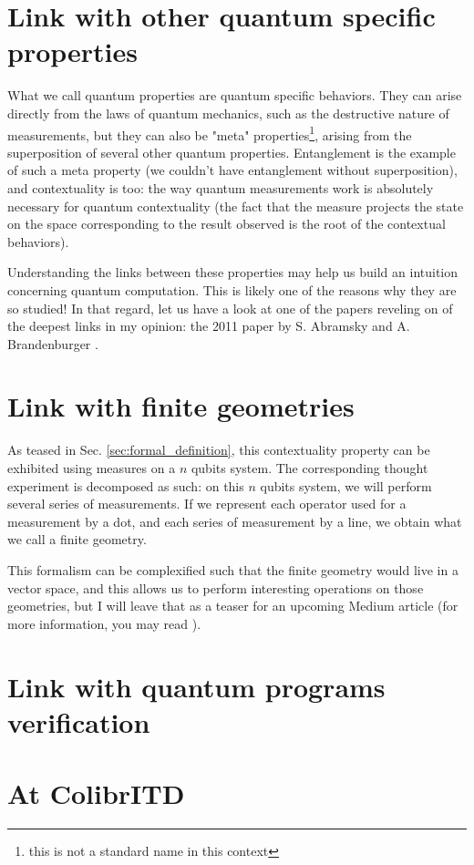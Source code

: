 \documentclass{article}
\begin{document}
\section{Link with other quantum specific properties}
\label{sec:link_with_other_quantum_specific_properties}

What we call quantum properties are quantum specific behaviors. They can arise
directly from the laws of quantum mechanics, such as the destructive nature of
measurements, but they can also be "meta" properties\footnote{this is not a
standard name in this context}, arising from the superposition of several other
quantum properties. Entanglement is the example of such a meta property
(we couldn't have entanglement without superposition), and contextuality is too:
the way quantum measurements work is absolutely necessary for quantum
contextuality (the fact that the measure projects the state on the space
corresponding to the result observed is the root of the contextual behaviors).

Understanding the links between these properties may help us build an intuition
concerning quantum computation. This is likely one of the reasons why they are
so studied! In that regard, let us have a look at one of the papers reveling on
of the deepest links in my opinion: the 2011 paper by S. Abramsky and A.
Brandenburger \cite{AB11}.

\section{Link with finite geometries}
\label{sec:link_with_finite_geometries}

As teased in Sec. \ref{sec:formal_definition}, this contextuality property can
be exhibited using measures on a $n$ qubits system. The corresponding thought
experiment is decomposed as such: on this $n$ qubits system, we will perform
several series of measurements. If we represent each operator used for a
measurement by a dot, and each series of measurement by a line, we obtain what we
call a finite geometry. 

This formalism can be complexified such that the finite geometry would live in a
vector space, and this allows us to perform interesting operations on those
geometries, but I will leave that as a teaser for an upcoming Medium article
(for more information, you may read \cite{dHG+22}).



\section{Link with quantum programs verification}
\label{sec:link_with_quantum_programs_verification}

\section*{At ColibrITD}



\end{document}
